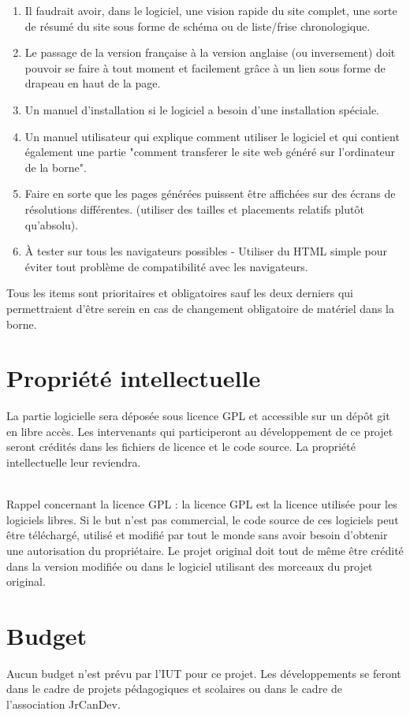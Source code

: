 \documentclass[11pt]{article}
\begin{document}
\begin{enumerate}
\item Il faudrait avoir, dans le logiciel, une vision rapide du site complet, une sorte de résumé du site sous forme de schéma ou de liste/frise chronologique.
\item Le passage de la version française à la version anglaise (ou inversement) doit pouvoir se faire à tout moment et facilement grâce à un lien sous forme de drapeau en haut de la page.
\item Un manuel d'installation si le logiciel a besoin d'une installation spéciale.
\item Un manuel utilisateur qui explique comment utiliser le logiciel et qui contient également une partie "comment transferer le site web généré sur l'ordinateur de la borne".
\item Faire en sorte que les pages générées puissent être affichées sur des écrans de résolutions différentes. (utiliser des tailles et placements relatifs plutôt qu'absolu).
\item À tester sur tous les navigateurs possibles - Utiliser du HTML simple pour éviter tout problème de compatibilité avec les navigateurs.
\end{enumerate}
Tous les items sont prioritaires et obligatoires sauf les deux derniers qui permettraient d'être serein en cas de changement obligatoire de matériel dans la borne.

\section{Propriété intellectuelle}
La partie logicielle sera déposée sous licence GPL et accessible sur un dépôt git en libre accès. Les intervenants qui participeront au développement de ce projet seront crédités dans les fichiers de licence et le code source. La propriété intellectuelle leur reviendra.\\~

Rappel concernant la licence GPL : la licence GPL est la licence utilisée pour les logiciels libres. Si le but n'est pas commercial, le code source de ces logiciels peut être téléchargé, utilisé et modifié par tout le monde sans avoir besoin d'obtenir une autorisation du propriétaire. Le projet original doit tout de même être crédité dans la version modifiée ou dans le logiciel utilisant des morceaux du projet original.

\section{Budget}
Aucun budget n'est prévu par l'IUT pour ce projet. Les développements se feront dans le cadre de projets pédagogiques et scolaires ou dans le cadre de l'association JrCanDev.
\end{document}
